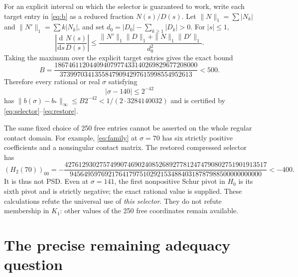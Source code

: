 \documentclass[11pt]{article}
\newcommand{\dd}{\mathrm d}
\begin{document}
For an explicit interval on which the selector is guaranteed to work,
write each target entry in \eqref{eq:b} as a reduced fraction
$N(s)/D(s)$.  Let $\|N\|_1=\sum|N_k|$ and
$\|N'\|_1=\sum k|N_k|$, and set
$d_0=|D_0|-\sum_{k\geq1}|D_k|>0$.
For $|s|\leq1$,
\[
 \left|\frac{\dd}{\dd s}\frac{N(s)}{D(s)}\right|
 \leq\frac{\|N'\|_1\|D\|_1+\|N\|_1\|D'\|_1}{d_0^2}.
\]
Taking the maximum over the explicit target entries gives the exact bound
\[
 B=\frac{18674611204409407977433140269829677208000}
          {37399703413558479094297615998554952613}<500.
\]
Therefore every rational or real $\sigma$ satisfying
\begin{equation}
 |\sigma-140|\leq2^{-42}
 \label{eq:familyinterval}
\end{equation}
has $\|b(\sigma)-b_*\|_\infty\leq B2^{-42}
<1/(2\cdot3284140032)$ and is certified by
\eqref{eq:selector}--\eqref{eq:restore}.

The same fixed choice of 250 free entries cannot be asserted on the
whole regular contact domain.  For example, \eqref{eq:family} at
$\sigma=70$ has six strictly positive coefficients and a nonsingular
contact matrix.  The restored compressed selector has
\begin{equation}
 (H_2(70))_{00}
 =-\frac{4276129302757499074690240852689277812474790802751901913517}
 {9456495976921764179751029215348840318787988500000000000}<-400.
 \label{eq:selectorfailure}
\end{equation}
It is thus not PSD.  Even at $\sigma=141$, the first nonpositive
Schur pivot in $H_0$ is its sixth pivot and is strictly negative;
the exact rational value is supplied.  These calculations refute the
universal use of \emph{this selector}.  They do not refute membership in
$K_1$: other values of the 250 free coordinates remain available.

\section{The precise remaining adequacy question}
\end{document}
